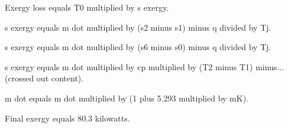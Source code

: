 Exergy loss equals T0 multiplied by s exergy.  

s exergy equals m dot multiplied by (s2 minus s1) minus q divided by Tj.  

s exergy equals m dot multiplied by (s6 minus s0) minus q divided by Tj.  

s exergy equals m dot multiplied by cp multiplied by (T2 minus T1) minus... (crossed out content).  

m dot equals m dot multiplied by (1 plus 5.293 multiplied by mK).  

Final exergy equals 80.3 kilowatts.